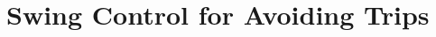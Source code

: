 \chapter{Swing Control for Avoiding Trips}\label{sec:trip_avoidance}

\graphicspath{{chapters/trip_avoidance/figures/}}





